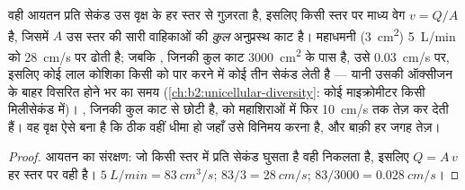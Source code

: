 \begin{theorem}[संतति: रक्त कहाँ धीमा पड़ता है]\label{thm:b2:blood-circulation:continuity}
वही आयतन प्रति सेकंड उस वृक्ष के हर स्तर से गुज़रता है, इसलिए किसी
स्तर पर माध्य वेग $v = Q/A$ है, जिसमें $A$ उस स्तर की सारी वाहिकाओं की
\emph{कुल} अनुप्रस्थ काट है। महाधमनी
(\qty{3}{cm^2}) \qty{5}{L/min} को \qty{28}{cm/s} पर ढोती है; जबकि
, जिनकी कुल काट \qty{3000}{cm^2} के पास है, उसे
\qty{0.03}{cm/s} पर, इसलिए कोई लाल कोशिका किसी  को पार करने में
कोई तीन सेकंड लेती है --- यानी उसकी ऑक्सीजन के बाहर विसरित होने भर का समय
(\cref{ch:b2:unicellular-diversity}: कोई माइक्रोमीटर किसी
मिलीसेकंड में)। , जिनकी कुल काट  से छोटी है,
 को महाशिराओं में फिर \qty{10}{cm/s} तक तेज़ कर देती हैं। वह
वृक्ष ऐसे बना है कि  ठीक वहीं धीमा हो जहाँ उसे
विनिमय करना है, और बाक़ी हर जगह तेज़।
\end{theorem}
\begin{proof}
आयतन का संरक्षण: जो किसी स्तर में प्रति सेकंड घुसता है वही निकलता है,
इसलिए $Q = A\,v$ हर स्तर पर वही है। $\qty{5}{L/min} =
\qty{83}{cm^3/s}$; $83/3 = \qty{28}{cm/s}$; $83/3000 =
\qty{0.028}{cm/s}$।
\end{proof}

